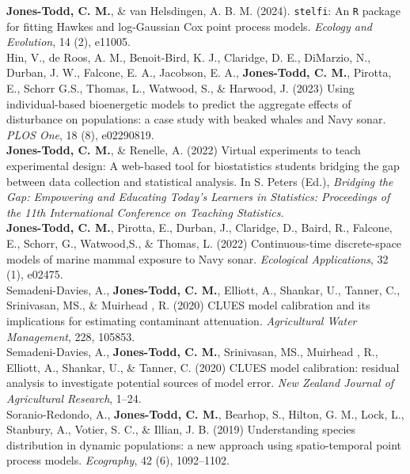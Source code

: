 \documentclass[10pt,a4paper]{moderncv}
\begin{document}
  \textbf{Jones-Todd, C. M.}, \& van Helsdingen, A. B. M. (2024). \texttt{stelfi}: An \texttt{R} package for fitting Hawkes and log-Gaussian Cox point process models. \textit{Ecology and Evolution}, 14 (2), e11005.\\

  Hin, V., de Roos, A. M., Benoit-Bird, K. J., Claridge, D. E., DiMarzio, N.,  Durban, J. W., Falcone, E. A., Jacobson, E. A., \textbf{Jones-Todd, C. M.}, Pirotta, E., Schorr G.S., Thomas, L., Watwood, S., \& Harwood, J. (2023) Using individual-based bioenergetic models to predict the aggregate effects of disturbance on populations: a case study with beaked whales and Navy sonar. \textit{PLOS One}, 18 (8), e02290819.\\

  \textbf{Jones-Todd, C. M.}, \& Renelle, A. (2022) Virtual experiments to teach experimental design: A web-based tool for biostatistics students bridging the gap between data collection and statistical analysis. In S. Peters (Ed.), \textit{Bridging the Gap: Empowering and Educating Today's Learners in Statistics: Proceedings of the 11th International Conference on Teaching Statistics}.\\
  
  \textbf{Jones-Todd, C. M.}, Pirotta, E., Durban, J., Claridge, D., Baird, R., Falcone, E., Schorr, G., Watwood,S., \& Thomas, L.  (2022) Continuous-time discrete-space models of marine mammal exposure to Navy sonar. \textit{Ecological Applications}, 32 (1), e02475.\\
 
  Semadeni-Davies, A., \textbf{Jones-Todd, C. M.},  Elliott, A., Shankar, U., Tanner, C., Srinivasan, MS., \& Muirhead , R. (2020) CLUES model calibration and its implications for estimating contaminant attenuation. \textit{Agricultural Water Management}, 228, 105853.\\

    Semadeni-Davies, A., \textbf{Jones-Todd, C. M.}, Srinivasan, MS.,  Muirhead , R.,  Elliott, A., Shankar, U., \& Tanner, C. (2020) CLUES model calibration: residual analysis to investigate potential sources of model error. \textit{New Zealand Journal of Agricultural Research}, 1--24.\\

 Soranio-Redondo, A., \textbf{Jones-Todd, C. M.}, Bearhop, S., Hilton, G. M., Lock, L., Stanbury, A., Votier, S. C., \& Illian, J. B. (2019) Understanding species distribution in dynamic populations: a new approach using spatio-temporal point process models. \textit{Ecography}, 42 (6), 1092--1102.\\
  
\end{document}
